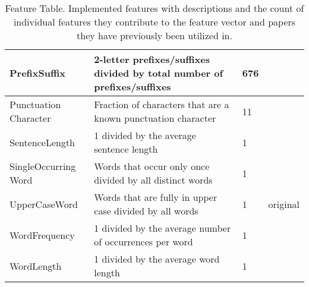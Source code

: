 \begin{table}[h]
\begin{center}
\begin{tabular}{p{2.6cm}|p{6cm}|p{1.2cm}|p{1.2cm}}
    PrefixSuffix            & 2-letter prefixes/suffixes divided by total number of prefixes/suffixes   & 676               & \cite{madigan2005author}\\ \hline
    Punctuation Character   & Fraction of characters that are a known punctuation character             & 11                & \cite{madigan2005author} \cite{narayanan2012feasibility}\\ \hline
    SentenceLength          & 1 divided by the average sentence length                                  & 1                 & \cite{de2001mining}\\ \hline
    SingleOccurring Word    & Words that occur only once divided by all distinct words                  & 1                 & \cite{madigan2005author} \cite{narayanan2012feasibility}\\ \hline
    UpperCaseWord           & Words that are fully in upper case divided by all words                   & 1                 & original\\ \hline
    WordFrequency           & 1 divided by the average number of occurrences per word                   & 1                 & \cite{madigan2005author} \cite{narayanan2012feasibility}\\ \hline
    WordLength              & 1 divided by the average word length                                      & 1                 & \cite{argamon2003style} \cite{narayanan2012feasibility}\\
    \end{tabular}
    \end{center}
    \caption{Feature Table. Implemented features with descriptions and the count of individual features they contribute to the feature vector and papers they have previously been utilized in.}
    \label{tab:featureTable}
\end{table}
